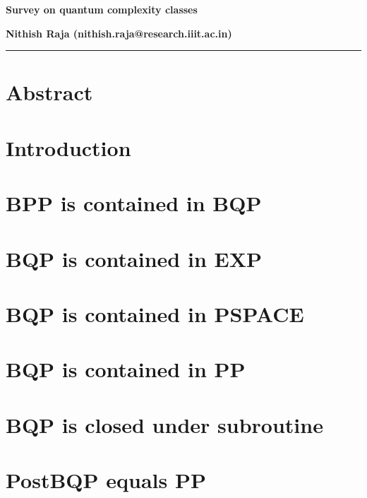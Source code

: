 



\noindent\textbf{\Large Survey on quantum complexity classes}
\vspace{2em}

\noindent
\textbf{Nithish Raja (nithish.raja@research.iiit.ac.in)}\\

\hrule

\section{Abstract}



\section{Introduction}



\section{BPP is contained in BQP}



\section{BQP is contained in EXP}



\section{BQP is contained in PSPACE}



\section{BQP is contained in PP}



\section{BQP is closed under subroutine}



\section{PostBQP equals PP}








